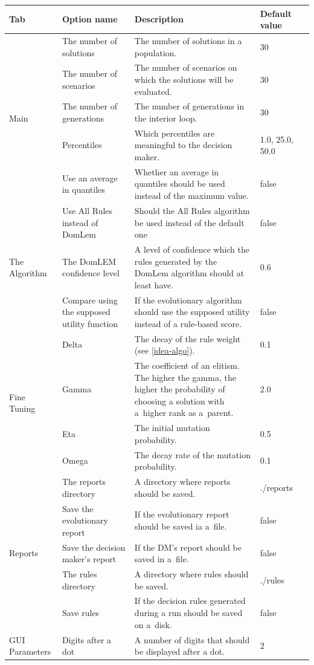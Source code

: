 \begin{table}[htb]
  \centering
  \begin{tabular}{l p{3.5cm} p{6.5cm} l l}
    \hline
    Tab & Option name & Description & Default value \\
    \hline
    \hline
    \multirow{5}{*}{Main}
    & The number of solutions & The number of solutions in a population. & 30 \\
    & The number of scenarios & The number of scenarios on which the solutions will be evaluated.  & 30 \\
    & The number of generations & The number of generations in the interior loop. & 30 \\
    & Percentiles & Which percentiles are meaningful to the decision maker. & 1.0, 25.0, 50.0  \\
    & Use an average in quantiles & Whether an average in quantiles should be used instead of
    the maximum value. & false  \\
    \hline
    \multirow{3}{*}{The Algorithm}
    & Use All Rules instead of DomLem & Should the All Rules algorithm be used
    instead of the default one & false \\
    & The DomLEM confidence level & A level of confidence which the rules generated by the
    DomLem algorithm should at least have. & 0.6 \\
    & Compare using the supposed utility function & If the evolutionary algorithm should use the
    supposed utility instead of a rule-based score. & false \\
    \hline
    \multirow{4}{*}{Fine Tuning} 
    & Delta & The decay of the rule weight (see \ref{idea-algo}). & 0.1  \\
    & Gamma & The coefficient of an elitism. The higher the gamma, the
    higher the probability of choosing a solution with a~higher rank as
    a~parent. & 2.0  \\ 
    & Eta & The initial mutation probability.  & 0.5    \\
    & Omega & The decay rate of the mutation probability. & 0.1  \\
    \hline
    \multirow{5}{*}{Reports} 
    & The reports directory & A directory where reports should be saved. &
    ./reports  \\
    & Save the evolutionary report & If the evolutionary report should be
    saved ia a~file. & false \\
    & Save the decision maker's report & If the DM's report should be
    saved in a~file. & false \\
    & The rules directory & A directory where rules should be saved. &
    ./rules  \\
    & Save rules & If the decision rules generated during a run should be
    saved on a~disk. & false \\
    \hline
    \multirow{1}{*}{GUI Parameters}
    & Digits after a dot & A number of digits that should be displayed after a
    dot. & 2 \\    
    \hline
  \end{tabular}
\end{table}



